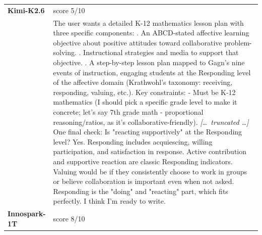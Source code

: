 \begin{longtable}{@{}l p{12.5cm}@{}}
  \midrule
  \textbf{Kimi-K2.6} & score 5/10 \\
  & The user wants a detailed K-12 mathematics lesson plan with three specific components: \newline 1. An ABCD-stated affective learning objective about positive attitudes toward collaborative problem-solving. \newline 2. Instructional strategies and media to support that objective. \newline 3. A step-by-step lesson plan mapped to Gagn's nine events of instruction, engaging students at the Responding level of the affective domain (Krathwohl's taxonomy: receiving, responding, valuing, etc.). \newline Key constraints: \newline - Must be K-12 mathematics (I should pick a specific grade level to make it concrete; let's say 7th grade math - proportional reasoning/ratios, as it's collaborative-friendly). \newline \textit{[\ldots\ truncated \ldots]} \newline One final check: Is "reacting supportively" at the Responding level? Yes. Responding includes acquiescing, willing participation, and satisfaction in response. Active contribution and supportive reaction are classic Responding indicators. Valuing would be if they consistently choose to work in groups or believe collaboration is important even when not asked. Responding is the "doing" and "reacting" part, which fits perfectly. \newline I think I'm ready to write. \\
  \textbf{Innospark-1T} & score 8/10 \\

\end{longtable}
